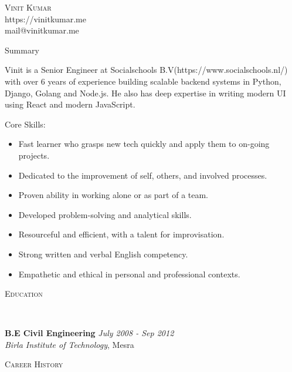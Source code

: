 \documentclass[9pt]{article}
\newenvironment{changemargin}[2]{%
  \begin{list}{}{%
    \setlength{\topsep}{0pt}%
    \setlength{\leftmargin}{#1}%
    \setlength{\rightmargin}{#2}%
    \setlength{\listparindent}{\parindent}%
    \setlength{\itemindent}{\parindent}%
    \setlength{\parsep}{\parskip}%
  }%
  \item[]}{\end{list}
}
\newcommand{\lineover}{
    \begin{changemargin}{-0.05in}{-0.05in}
        \vspace*{-8pt}
        \hrulefill \\
        \vspace*{-2pt}
    \end{changemargin}
}
\newcommand{\header}[1]{
    \begin{changemargin}{-0.5in}{-0.5in}
        \scshape{#1}\\
    \lineover
    \end{changemargin}
}
\newcommand{\contact}[4]{
    \begin{changemargin}{-0.5in}{-0.5in}
        \begin{center}
            {\Large \scshape {#1}}\\ \smallskip
            {#2}\\ \smallskip
            {#3}\\ \smallskip
            {#4}\smallskip
        \end{center}
    \end{changemargin}
}
\newenvironment{body} {
    \vspace*{-16pt}
    \begin{changemargin}{-0.25in}{-0.5in}
  }
    {\end{changemargin}
}
\begin{document}
\contact{Vinit Kumar}{https://vinitkumar.me}{mail@vinitkumar.me}


\header{Summary}

\begin{body}
    \vspace{14pt}
Vinit is a Senior Engineer at Socialschools B.V(https://www.socialschools.nl/) with over 6 years of experience building scalable backend systems in Python, Django, Golang and Node.js. He also has deep expertise in writing modern UI using React and modern JavaScript.


Core Skills:
\begin{itemize} \itemsep -0pt
    \item Fast learner who grasps new tech quickly and apply them to on-going projects.
    \item Dedicated to the improvement of self, others, and involved processes.
    \item Proven ability in working alone or as part of a team.
    \item Developed problem-solving and analytical skills.
    \item Resourceful and efficient, with a talent for improvisation.
    \item Strong written and verbal English competency.
    \item Empathetic and ethical in personal and professional contexts.
\end{itemize}

\end{body}

\smallskip


\header{Education}

\begin{body}
    \vspace{14pt}
    \textbf{B.E Civil Engineering }{} \hfill \emph{July 2008 - Sep 2012}{} \\
    \emph{Birla Institute of Technology}, Mesra{} \\
\end{body}

\smallskip


\header{Career History}
\end{document}
